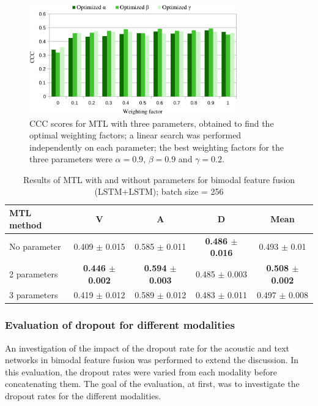 \begin{figure}[htpb]
\centering
\includegraphics[width=0.8\textwidth]{../fig/alpha_beta_gamma.pdf}
\caption{CCC scores for MTL with three parameters, obtained to find the optimal weighting factors; a linear search was performed independently on each parameter; the best weighting factors for the three parameters were $\alpha=0.9$, $\beta=0.9$ and $\gamma=0.2$.}
\label{fig:ccc_3-params}
\end{figure}

\begin{table}[htpb]
  \caption{Results of MTL with and without parameters for bimodal feature fusion (LSTM+LSTM); batch size = 256}
  \begin{center}
 \label{tab:mtl-result}
 \begin{tabular}{l c c c c} 
 \hline
MTL method & V & A & D & Mean\\
\hline \hline
No parameter & 0.409 $\pm$ 0.015 & 0.585 $\pm $ 0.011 & \textbf{0.486 $\pm$
0.016} & 0.493 $\pm$ 0.01 \\
2 parameters & \textbf{0.446 $\pm$ 0.002} & \textbf{0.594 $\pm $ 0.003} &
0.485 $\pm$ 0.003 & \textbf{0.508 $\pm$ 0.002} \\
3 parameters & 0.419 $\pm$ 0.012 & 0.589 $\pm $ 0.012 & 0.483 $\pm$ 0.011 &
0.497 $\pm$ 0.008 \\
 \hline
 \end{tabular}
\end{center}
\end{table}

\subsubsection{Evaluation of dropout for different modalities}
An investigation of the impact of the dropout rate for the acoustic and text
networks in bimodal feature fusion was performed to extend the discussion. In
this evaluation, the dropout rates were varied from each modality before
concatenating them. The goal of the evaluation, at first, was to investigate
the dropout rates for the different modalities.


